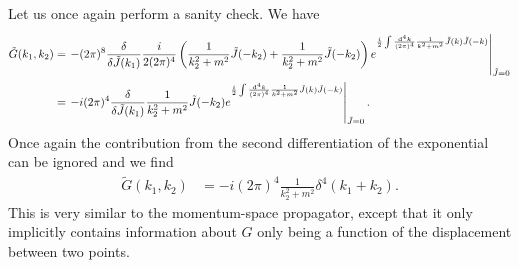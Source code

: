 Let us once again perform a sanity check. We have
\begin{align*}
	\tilde{G}(k_{1}, k_{2}) &= \eval{-(2\pi)^{8}\fdv{\tilde{J}(k_{1})}\frac{i}{2(2\pi)^{4}}\left(\frac{1}{k_{2}^{2} + m^{2}}\tilde{J}(-k_{2}) + \frac{1}{k_{2}^{2} + m^{2}}\tilde{J}(-k_{2})\right)e^{\frac{i}{2}\inte{}{}\frac{\dd[4]{k}}{(2\pi)^{4}}\frac{1}{k^{2} + m^{2}}\tilde{J}(k)\tilde{J}(-k)}}_{\tilde{J} = 0} \\
	&= \eval{-i(2\pi)^{4}\fdv{\tilde{J}(k_{1})}\frac{1}{k_{2}^{2} + m^{2}}\tilde{J}(-k_{2})e^{\frac{i}{2}\inte{}{}\frac{\dd[4]{k}}{(2\pi)^{4}}\frac{1}{k^{2} + m^{2}}\tilde{J}(k)\tilde{J}(-k)}}_{\tilde{J} = 0}.
\end{align*}
Once again the contribution from the second differentiation of the exponential can be ignored and we find
\begin{align*}
	\tilde{G}(k_{1}, k_{2}) &= -i(2\pi)^{4}\frac{1}{k_{2}^{2} + m^{2}}\delta^{4}(k_{1} + k_{2}).
\end{align*}
This is very similar to the momentum-space propagator, except that it only implicitly contains information about $G$ only being a function of the displacement between two points.

